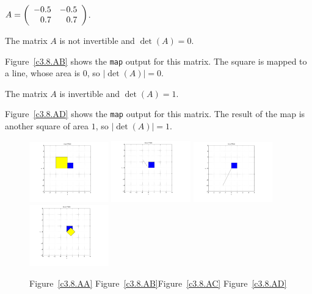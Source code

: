 \documentclass{ximera}
\begin{document}
\begin{computerExercise}  \label{c3.8.AB}
$A=\left(\begin{array}{rr} -0.5 & -0.5\\ 0.7 &0.7\end{array}\right)$.

\begin{solution}
\ans The matrix $A$ is not invertible and $\det(A) = 0$.

\soln Figure~\ref{c3.8.AB} shows the {\tt map} output for this matrix.
The square is mapped to a line, whose area is $0$, so $|\det(A)| = 0$.

\ans The matrix $A$ is invertible and $\det(A) = 1$.

\soln Figure~\ref{c3.8.AD} shows the {\tt map} output for this matrix.
The result of the map is another square of area $1$, so $|\det(A)| = 1$.

\begin{figure}[htb]
                       \centerline{%
                       \includegraphics[width=1.35in]{exfigure/3-8-AA.pdf}
                       \includegraphics[width=1.35in]{exfigure/3-8-AB.pdf}
                       \includegraphics[width=1.35in]{exfigure/3-8-AC.pdf}
                       \includegraphics[width=1.35in]{exfigure/3-8-AD.pdf}}
        \centerline{Figure~\ref{c3.8.AA}\hspace{0.8in}
        Figure~\ref{c3.8.AB}\hspace{0.8in}Figure~\ref{c3.8.AC}
        \hspace{0.8in}Figure~\ref{c3.8.AD}}

    \end{figure}
\end{solution}    
\end{computerExercise}
\end{document}
